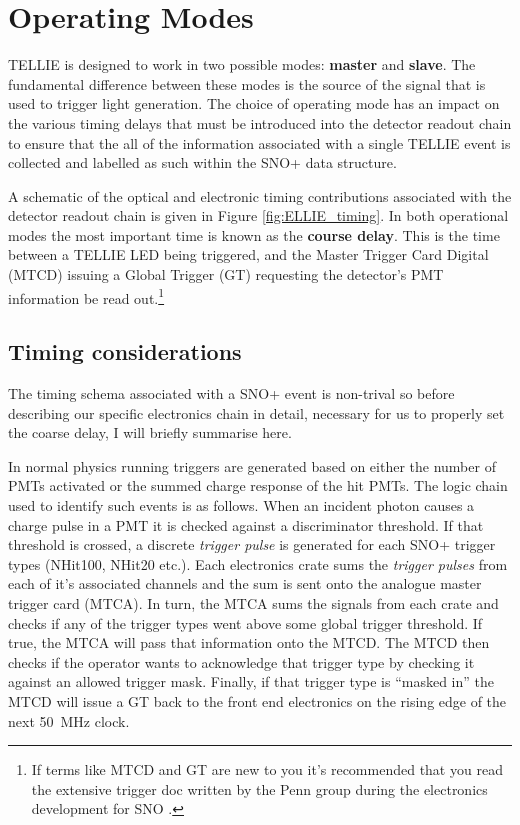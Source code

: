 \documentclass[12pt]{report}
\begin{document}
\section{Operating Modes}
\label{subsec:OperatingModes}
TELLIE is designed to work in two possible modes: \textbf{master} and \textbf{slave}. The fundamental difference between these modes is the source of the signal that is used to trigger light generation. The choice of operating mode has an impact on the various timing delays that must be introduced into the detector readout chain to ensure that the all of the information associated with a single TELLIE event is collected and labelled as such within the SNO+ data structure.

A schematic of the optical and electronic timing contributions associated with the detector readout chain is given in Figure \ref{fig:ELLIE_timing}. In both operational modes the most important time is known as the \textbf{course delay}. This is the time between a TELLIE LED being triggered, and the Master Trigger Card Digital (MTCD) issuing a Global Trigger (GT) requesting the detector's PMT information be read out.\footnote{If terms like MTCD and GT are new to you it's recommended that you read the extensive trigger doc written by the Penn group during the electronics development for SNO \cite{snoTrigger}.}

\subsection{Timing considerations}

The timing schema associated with a SNO+ event is non-trival so before describing our specific electronics chain in detail, necessary for us to properly set the coarse delay, I will briefly summarise here. 

In normal physics running triggers are generated based on either the number of PMTs activated or the summed charge response of the hit PMTs. The logic chain used to identify such events is as follows. When an incident photon causes a charge pulse in a PMT it is checked against a discriminator threshold. If that threshold is crossed, a discrete \textit{trigger pulse} is generated for each SNO+ trigger types (NHit100, NHit20 etc.). Each electronics crate sums the \textit{trigger pulses} from each of it's associated channels and the sum is sent onto the analogue master trigger card (MTCA). In turn, the MTCA sums the signals from each crate and checks if any of the trigger types went above some global trigger threshold. If true, the MTCA will pass that information onto the MTCD. The MTCD then checks if the operator wants to acknowledge that trigger type by checking it against an allowed trigger mask. Finally, if that trigger type is ``masked in'' the MTCD will issue a GT back to the front end electronics on the rising edge of the next 50~MHz clock. 
\end{document}
